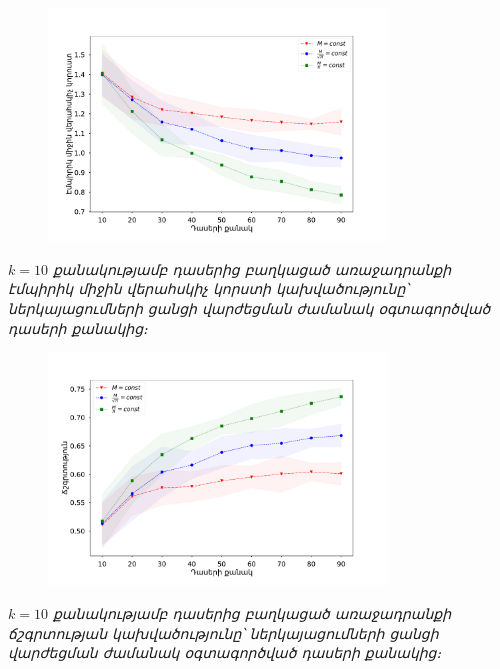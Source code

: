 \documentclass[10pt]{beamer}
\begin{document}
\begin{frame}
\begin{figure}[htp]
\centering
\includegraphics[width=0.8\textwidth]{imgs/k=10.pdf}
\end{figure}
\begin{center}
 \fontsize{7pt}{7pt} 
\armfont \textit{$k=10$ քանակությամբ դասերից բաղկացած առաջադրանքի էմպիրիկ միջին վերահսկիչ կորստի կախվածությունը՝ ներկայացումների ցանցի վարժեցման ժամանակ  օգտագործված դասերի քանակից։}
\end{center}
\end{frame}


\begin{frame}
\begin{figure}[htp]
\centering
\includegraphics[width=0.8\textwidth]{imgs/k=10_acc.pdf}
\end{figure}
\begin{center}
 \fontsize{7pt}{7pt} 
\armfont \textit{$k=10$ քանակությամբ դասերից բաղկացած առաջադրանքի ճշգրտության կախվածությունը՝ ներկայացումների ցանցի վարժեցման ժամանակ  օգտագործված դասերի քանակից։}
\end{center}
\end{frame}
\end{document}
